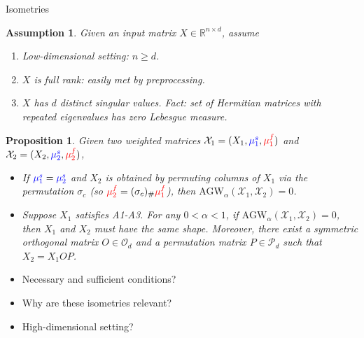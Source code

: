 \documentclass{beamer}
\newcommand{\agw}{\text{AGW}}
\newcommand{\cX}{\mathcal X}
\newcommand{\bbR}{\mathbb R}
\newcommand{\mfsrc}{{\color{red}{\mu_1^f}}}
\newcommand{\mftg}{{\color{red}{\mu_2^f}}}
\newcommand{\mssrc}{{\color{blue}{\mu_1^s}}}
\newcommand{\mstg}{{\color{blue}{\mu_2^s}}}
\newtheorem{proposition}{Proposition}[section]
\newtheorem{assumption}{Assumption}
\begin{document}
\begin{frame}{Isometries}
\scriptsize
\vspace{-0.3cm}

\begin{assumption}
Given an input matrix $X \in \bbR^{n \times d}$, assume
\begin{enumerate}
  \setlength\itemindent{15pt}
  \item[(A1)] Low-dimensional setting: $n \geq d$.
  \item[(A2)] $X$ is full rank: easily met by preprocessing.
  \item[(A3)] $X$ has $d$ distinct singular values. Fact:
  set of Hermitian matrices with repeated eigenvalues has zero Lebesgue measure.
\end{enumerate}
\end{assumption}
\begin{proposition}
  Given two weighted matrices $\cX_1 = (X_1, \mssrc, \mfsrc)$
  and $\cX_2 = (X_2, \mstg, \mftg)$,
  \begin{itemize}
    \setlength\itemindent{15pt}
    \item[$(\Rightarrow)$] If $\mssrc = \mstg$ and
    $X_2$ is obtained by permuting columns of $X_1$ via
    the permutation $\sigma_c$ (so $\mftg = (\sigma_c)_{\#} \mfsrc$),
    then $\agw_{\alpha}(\cX_1, \cX_2) = 0$.
    \item[$(\Leftarrow)$] Suppose $X_1$ satisfies A1-A3. For any $0 < \alpha < 1$,
    if $\agw_{\alpha}(\cX_1, \cX_2) = 0$, then $X_1$ and $X_2$ must have the same shape.
    Moreover, there exist a symmetric orthogonal matrix $O \in \mathcal O_d$
    and a permutation matrix $P \in \mathcal P_d$ such that $X_2 = X_1 OP$.
  \end{itemize}
\end{proposition}

\begin{minipage}[t]{0.2\linewidth}
\end{minipage}
\hfill%
\begin{minipage}[t]{0.8\linewidth}
  \begin{itemize}
    \item[$\bullet$] Necessary and sufficient conditions?
    \item[$\bullet$] Why are these isometries relevant?
    \item[$\bullet$] High-dimensional setting?
  \end{itemize}
\end{minipage}%


\end{frame}
\end{document}
